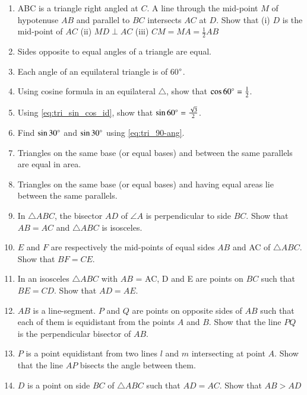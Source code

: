 \begin{enumerate}[label=\arabic*.,ref=\thesubsection.\theenumi]
\item ABC is a triangle right angled at $C$. A line through the mid-point $M$ of hypotenuse $AB$ and parallel to $BC$ intersects $AC$ at $D$. Show that (i) $D$ is the mid-point of $AC$
(ii) $MD \perp AC$ (iii) $CM = MA = \frac{1}{2}AB$

\item  Sides opposite to equal angles of a triangle are equal. 
%
\item  Each angle of an equilateral triangle is of 60$\degree$. 
%
\item Using cosine formula in an equilateral $\triangle$, show that $\cos 60\degree = \frac{1}{2} $.  
\item Using \eqref{eq:tri_sin_cos_id}, show that $\sin 60\degree = \frac{\sqrt{3}}{2} $.
\item Find  $\sin 30\degree$ and  $\sin 30\degree$ using \eqref{eq:tri_90-ang}.
\item Triangles on the same base (or equal bases) and between the same parallels are equal in area.
\item Triangles on the same base (or equal bases) and having equal areas lie between the same parallels.
\item In $\triangle ABC$, the bisector $AD$ of $\angle  A$ is perpendicular to side $BC$. Show that $AB = AC$ and $\triangle ABC$ is isosceles.
\item $E$ and $F$ are respectively the mid-points of equal sides $AB$ and AC of $\triangle ABC$. Show that $BF = CE$. 
\item In an isosceles $\triangle ABC$ with $AB$ = AC, D and E are points on $BC$ such that $BE = CD$. Show that $AD = AE$. 
%
\item $AB$ is a line-segment. $P$ and $Q$ are points on opposite sides of $AB$ such that each of them is equidistant from the points $A$ and $B$. Show that the line $PQ $ is the perpendicular bisector of $AB$.
%
\item $P$ is a point equidistant from two lines $l$ and $m$ intersecting at point $A$.  Show that the line  $AP$  bisects the angle between them.
%
\item $D$ is a point on side $BC$ of $\triangle  ABC$ such that $AD = AC$. Show that $AB > AD$


\end{enumerate}
